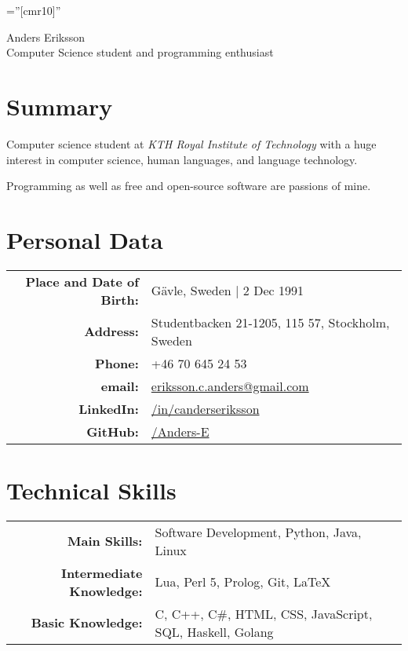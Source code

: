 \documentclass[a4paper,10pt]{article}
\begin{document}
\pagestyle{empty} %

\font\fb=''[cmr10]'' %

\par{
    \centering
	{
	    \Huge \bitter Anders Eriksson \\
	    \normalfont
	    \normalsize Computer Science student and programming enthusiast
	}
	\bigskip\par
}

\section{Summary}
Computer science student at \emph{KTH Royal Institute of Technology} with a huge interest in computer science, human languages, and language technology.

Programming as well as free and open-source software are passions of mine.

\section{Personal Data}

\begin{tabular}{rl}
    \textbf{Place and Date of Birth:} & G{\"a}vle, Sweden  | 2 Dec 1991 \\
    \textbf{Address:}   & Studentbacken 21-1205, 115 57, Stockholm, Sweden \\
    \textbf{Phone:}     & +46 70 645 24 53\\
    \textbf{email:}     & \href{mailto:eriksson.c.anders@gmail.com
}{eriksson.c.anders@gmail.com}\\
    \textbf{LinkedIn:}	& \href{http://se.linkedin.com/in/canderseriksson}{/in/canderseriksson}\\
    \textbf{GitHub:}	& \href{http://github.com/Anders-E}{/Anders-E}
\end{tabular}

\section{Technical Skills}
\begin{tabular}{rl}
\textbf{Main Skills:}& Software Development, Python, Java, Linux \\
\textbf{Intermediate Knowledge:}& Lua, Perl 5, Prolog, Git, \LaTeX\\
\textbf{Basic Knowledge:}& C, C++, C\#, HTML, CSS, JavaScript, SQL, Haskell, Golang \\
\end{tabular}
\end{document}
